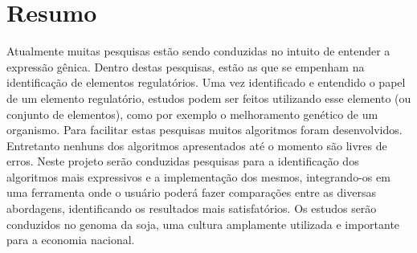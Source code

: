 \chapter{Resumo}

Atualmente muitas pesquisas estão sendo conduzidas no intuito de entender a expressão gênica. Dentro destas pesquisas, estão as que se empenham na identificação de elementos regulatórios. Uma vez identificado e entendido o papel de um elemento regulatório, estudos podem ser feitos utilizando esse elemento (ou conjunto de elementos), como por exemplo o melhoramento genético de um organismo. Para facilitar estas pesquisas muitos algoritmos foram desenvolvidos. Entretanto nenhuns dos algoritmos apresentados até o momento são livres de erros. Neste projeto serão conduzidas pesquisas para a identificação dos algoritmos mais expressivos e a implementação dos mesmos, integrando-os em uma ferramenta onde o usuário poderá fazer comparações entre as diversas abordagens, identificando os resultados mais satisfatórios. Os estudos serão conduzidos no genoma da soja, uma cultura amplamente utilizada e importante para a economia nacional.